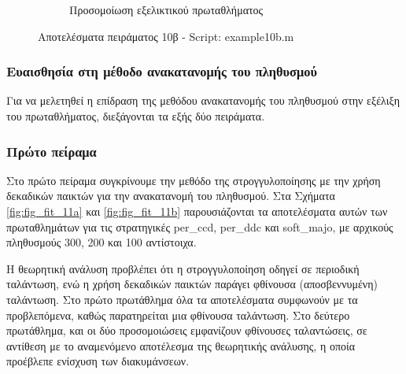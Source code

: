 \documentclass[12pt]{report}
\begin{document}
\begin{figure}[htbp]
\begin{subfigure}[b]{0.5\linewidth}
        \caption{Προσομοίωση εξελικτικού πρωταθλήματος}
        \label{fig:fig_fit_10b_c}
        
    \end{subfigure}

    \caption{Αποτελέσματα πειράματος 10β - \foreignlanguage{english}{Script: example10b.m}}
    \label{fig:fig_fit_10b}
\end{figure}

\subsubsection{Ευαισθησία στη μέθοδο ανακατανομής του πληθυσμού}
Για να μελετηθεί η επίδραση της μεθόδου ανακατανομής του πληθυσμού στην εξέλιξη του πρωταθλήματος, διεξάγονται τα εξής δύο πειράματα.

\subsubsection*{Πρώτο πείραμα}
Στο πρώτο πείραμα συγκρίνουμε την μεθόδο της στρογγυλοποίησης με την χρήση δεκαδικών παικτών για την ανακατανομή του πληθυσμού.
Στα Σχήματα \ref{fig:fig_fit_11a} και \ref{fig:fig_fit_11b} παρουσιάζονται τα αποτελέσματα αυτών των πρωταθλημάτων για τις στρατηγικές \foreignlanguage{english}{per\_ccd}, \foreignlanguage{english}{per\_ddc} και \foreignlanguage{english}{soft\_majo}, με αρχικούς πληθυσμούς 300, 200 και 100 αντίστοιχα.

Η θεωρητική ανάλυση προβλέπει ότι η στρογγυλοποίηση οδηγεί σε περιοδική ταλάντωση, ενώ η χρήση δεκαδικών παικτών παράγει φθίνουσα (αποσβεννυμένη) ταλάντωση.
Στο πρώτο πρωτάθλημα όλα τα αποτελέσματα συμφωνούν με τα προβλεπόμενα, καθώς παρατηρείται μια φθίνουσα ταλάντωση.
Στο δεύτερο πρωτάθλημα, και οι δύο προσομοιώσεις εμφανίζουν φθίνουσες ταλαντώσεις, σε αντίθεση με το αναμενόμενο αποτέλεσμα της θεωρητικής ανάλυσης, η οποία προέβλεπε ενίσχυση των διακυμάνσεων.
\end{document}
